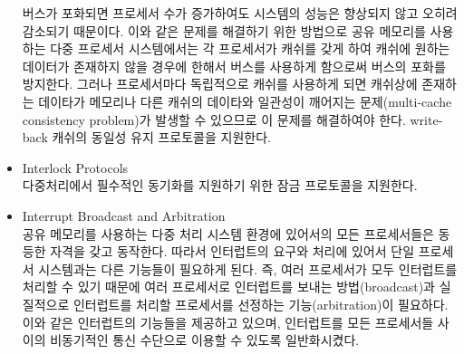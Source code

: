 \begin{itemize}
		버스가 포화되면 프로세서 수가 증가하여도 시스템의 성능은
		향상되지 않고 오히려 감소되기 때문이다.
		이와 같은 문제를 해결하기 위한 방법으로 공유 메모리를 사용하는
		다중 프로세서 시스템에서는 각 프로세서가 캐쉬를 갖게
		하여 캐쉬에 원하는 데이터가 존재하지 않을 경우에 한해서
		버스를 사용하게 함으로써 버스의 포화를 방지한다.
		그러나 프로세서마다 독립적으로 캐쉬를 사용하게 되면 
		캐쉬상에 존재하는 데이타가 메모리나 다른 캐쉬의 데이타와
		일관성이 깨어지는 문제(multi-cache consistency problem)가
		발생할 수 있으므로 이 문제를 해결하여야 한다.
		 write-back
		캐쉬의 동일성 유지 프로토콜을 지원한다.
	\item Interlock Protocols \\
		다중처리에서 필수적인 동기화를 지원하기 위한 잠금 프로토콜을 지원한다.
	\item Interrupt Broadcast and Arbitration \\
		공유 메모리를 사용하는 다중 처리 시스템 환경에 있어서의
		모든 프로세서들은 동등한 자격을 갖고 
		동작한다. 따라서 인터럽트의 요구와 처리에 있어서 단일
		프로세서 시스템과는 다른 기능들이 필요하게 된다.
		즉, 여러 프로세서가 모두 인터럽트를 처리할 수 있기 때문에
		여러 프로세서로 인터럽트를 보내는 방법(broadcast)과
		실질적으로 인터럽트를 처리할 프로세서를 선정하는
		기능(arbitration)이 필요하다.
		 이와 같은 인터럽트의 기능들을 제공하고 있으며,
		인터럽트를 모든 프로세서들 사이의
		비동기적인 통신 수단으로 이용할 수 있도록 일반화시켰다.
\end{itemize}

